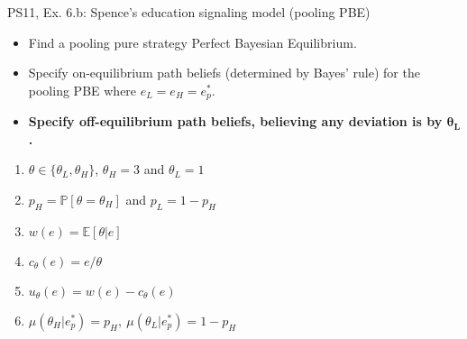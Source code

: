 \begin{frame}{PS11, Ex. 6.b: Spence’s education signaling model (pooling PBE)}
    \begin{itemize}
      \item[(b)] Find a pooling pure strategy Perfect Bayesian Equilibrium.
    \end{itemize}\vspace{-8pt}
    \begin{multicols}{2}
      \begin{itemize}
        \item[Step 1:] Specify on-equilibrium path beliefs (determined by Bayes' rule) for the pooling PBE where $e_L=e_H=e_p^*$.
        \item[Step 2:] \textbf{Specify off-equilibrium path beliefs, believing any deviation is by $\bm{\theta_L}$.}
      \end{itemize}
      \vfill\null\columnbreak
      \begin{enumerate}
        \item[Types:] $\theta\in\{\theta_L,\theta_H\}$, $\theta_H=3$ and $\theta_L=1$
        \item[Prob.:] $p_H=\mathbb{P}[\theta=\theta_H]$ and $p_L=1-p_H$
        \item[Wage:] $w(e)=\mathbb{E}[\theta|e]$
        \item[Cost:] $c_\theta(e)=e/\theta$
        \item[Utility:] $u_\theta(e)=w(e)-c_\theta(e)$
        \item $\mu\left(\theta_H|e_p^*\right)=p_H,\
               \mu\left(\theta_L|e_p^*\right)=1-p_H$
      \end{enumerate}
    \end{multicols}
    \vfill\null
\end{frame}

